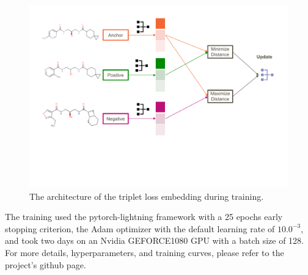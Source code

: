 \documentclass[journal=jacsat,manuscript=article]{achemso}
\begin{document}
\begin{figure}[hbtp]
\centering
\includegraphics[width=\textwidth, trim={0 4cm 0 0},clip]{data/triplet_network.pdf}
\caption{The architecture of the triplet loss embedding during training.}
\label{fig:triplet_arch}
\end{figure}


 The training used the pytorch-lightning framework \cite{falcon2019pytorch} with a 25 epochs early stopping criterion, the Adam optimizer with the default learning rate of $10.0^{-3}$, and took two days on an Nvidia GEFORCE1080 GPU with a batch size of 128. For more details, hyperparameters, and training curves, please refer to the project's github page.
\end{document}
